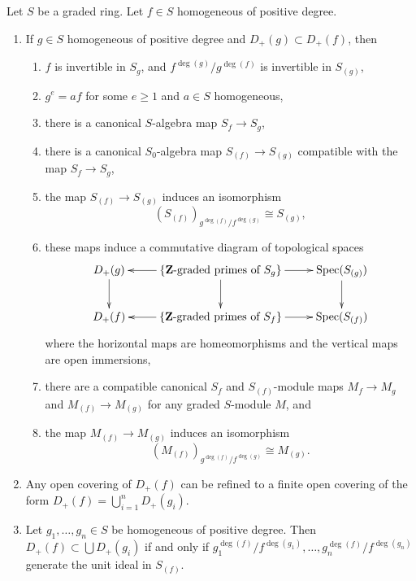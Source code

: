 \begin{lemma}
\label{lemma-standard-open}
Let $S$ be a graded ring. Let $f \in S$ homogeneous of positive degree.
\begin{enumerate}
\item If $g\in S$ homogeneous of positive degree
and $D_{+}(g) \subset D_{+}(f)$, then
\begin{enumerate}
\item $f$ is invertible in $S_g$, and
$f^{\deg(g)}/g^{\deg(f)}$ is invertible in $S_{(g)}$,
\item $g^e = af$ for some $e \geq 1$ and $a \in S$ homogeneous,
\item there is a canonical $S$-algebra map $S_f \to S_g$,
\item there is a canonical $S_0$-algebra map $S_{(f)} \to S_{(g)}$
compatible with the map $S_f \to S_g$,
\item the map $S_{(f)} \to S_{(g)}$ induces an isomorphism
$$
(S_{(f)})_{g^{\deg(f)}/f^{\deg(g)}} \cong S_{(g)},
$$
\item these maps induce a commutative diagram of
topological spaces
$$
\xymatrix{
D_{+}(g) \ar[d] &
\{\mathbf{Z}\text{-graded primes of }S_g\} \ar[l] \ar[r] \ar[d] &
\text{Spec}(S_{(g)}) \ar[d] \\
D_{+}(f) &
\{\mathbf{Z}\text{-graded primes of }S_f\} \ar[l] \ar[r] &
\text{Spec}(S_{(f)})
}
$$
where the horizontal maps are homeomorphisms and the vertical maps
are open immersions,
\item there are a compatible canonical $S_f$ and $S_{(f)}$-module
maps $M_f \to M_g$ and $M_{(f)} \to M_{(g)}$ for any graded $S$-module $M$,
and
\item the map $M_{(f)} \to M_{(g)}$ induces an isomorphism
$$
(M_{(f)})_{g^{\deg(f)}/f^{\deg(g)}} \cong M_{(g)}.
$$
\end{enumerate}
\item Any open covering of $D_{+}(f)$ can be refined to a finite
open covering of the form $D_{+}(f) = \bigcup_{i = 1}^n D_{+}(g_i)$.
\item Let $g_1, \ldots, g_n \in S$ be homogeneous of positive degree.
Then $D_{+}(f) \subset \bigcup D_{+}(g_i)$
if and only if
$g_1^{\deg(f)}/f^{\deg(g_1)}, \ldots, g_n^{\deg(f)}/f^{\deg(g_n)}$
generate the unit ideal in $S_{(f)}$.
\end{enumerate}
\end{lemma}

